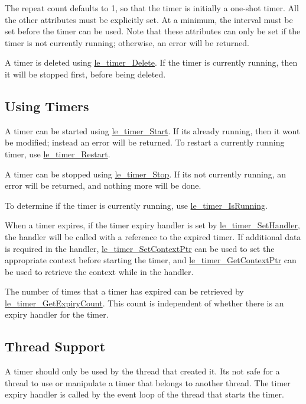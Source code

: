 The repeat count defaults to 1, so that the timer is initially a one-\/shot timer. All the other attributes must be explicitly set. At a minimum, the interval must be set before the timer can be used. Note that these attributes can only be set if the timer is not currently running; otherwise, an error will be returned.

A timer is deleted using \hyperlink{le__timer_8h_ae103f6736bf855e77e5e59bbad1e27a7}{le\+\_\+timer\+\_\+\+Delete}. If the timer is currently running, then it will be stopped first, before being deleted.\hypertarget{c_timer_timer_usage}{}\subsection{Using Timers}\label{c_timer_timer_usage}
A timer can be started using \hyperlink{le__timer_8h_ada2ce7f8cb1e76ed959e323ae94bbfc0}{le\+\_\+timer\+\_\+\+Start}. If it\textquotesingle{}s already running, then it won\textquotesingle{}t be modified; instead an error will be returned. To restart a currently running timer, use \hyperlink{le__timer_8h_ab6b83d6302095a46b6046160c0a479bb}{le\+\_\+timer\+\_\+\+Restart}.

A timer can be stopped using \hyperlink{le__timer_8h_af310daa378bd6ca39373a47e073f2243}{le\+\_\+timer\+\_\+\+Stop}. If it\textquotesingle{}s not currently running, an error will be returned, and nothing more will be done.

To determine if the timer is currently running, use \hyperlink{le__timer_8h_ab33b8568fd394d38274b778130111f70}{le\+\_\+timer\+\_\+\+Is\+Running}.

When a timer expires, if the timer expiry handler is set by \hyperlink{le__timer_8h_abbf8d4c3c78d7bf5801b94071adcb6c6}{le\+\_\+timer\+\_\+\+Set\+Handler}, the handler will be called with a reference to the expired timer. If additional data is required in the handler, \hyperlink{le__timer_8h_af6900bdb4653ff95f7f7be918b9e482d}{le\+\_\+timer\+\_\+\+Set\+Context\+Ptr} can be used to set the appropriate context before starting the timer, and \hyperlink{le__timer_8h_aa0432dbabb32b546c0c0e6ced5ba9d3d}{le\+\_\+timer\+\_\+\+Get\+Context\+Ptr} can be used to retrieve the context while in the handler.

The number of times that a timer has expired can be retrieved by \hyperlink{le__timer_8h_a554cff1d11525bb60115291248f3ff53}{le\+\_\+timer\+\_\+\+Get\+Expiry\+Count}. This count is independent of whether there is an expiry handler for the timer.\hypertarget{c_timer_le_timer_thread}{}\subsection{Thread Support}\label{c_timer_le_timer_thread}
A timer should only be used by the thread that created it. It\textquotesingle{}s not safe for a thread to use or manipulate a timer that belongs to another thread. The timer expiry handler is called by the event loop of the thread that starts the timer.

